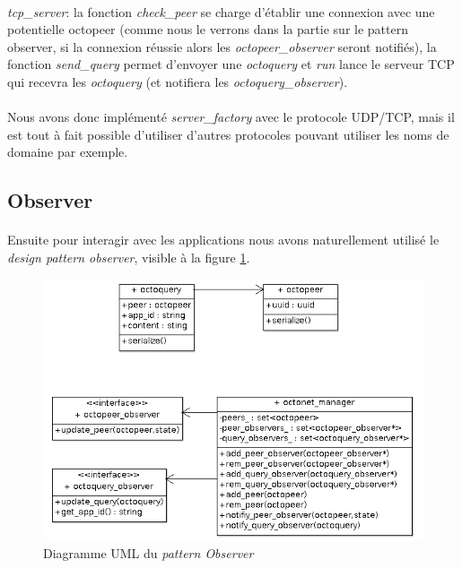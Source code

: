 \documentclass[a4paper]{article}
\begin{document}
			\paragraph{}{
			\textit{tcp\_server}: la fonction \textit{check\_peer} se charge d’établir une connexion avec une potentielle octopeer
			(comme nous le verrons dans la partie sur le pattern observer, si la connexion réussie alors les
			\textit{octopeer\_observer} seront notifiés), la fonction \textit{send\_query} permet d’envoyer une \textit{octoquery} et 
			\textit{run} lance le serveur TCP qui recevra les \textit{octoquery} (et notifiera les \textit{octoquery\_observer}).
			}
			
			\paragraph{}{
			Nous avons donc implémenté \textit{server\_factory} avec le protocole UDP/TCP, mais il est tout à fait 
			possible d’utiliser d’autres protocoles pouvant utiliser les noms de domaine par exemple.
			}

		\subsection{Observer}
		
			\paragraph{}{
			Ensuite pour interagir avec les applications nous avons naturellement utilisé le \textit{design pattern observer},
			visible à la figure \ref{observer_uml}.
			}

			\begin{figure}[!h]
				\centering
				\includegraphics[scale=0.65]{UML/octonet_observer1.png}
				\caption{\label{observer_uml} Diagramme UML du \textit{pattern Observer}}
			\end{figure}
			
\end{document}
